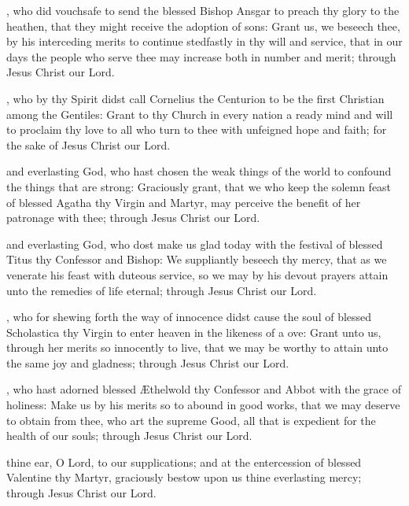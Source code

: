 , who did vouchsafe to send the blessed Bishop Ansgar to preach thy glory to the heathen, that they might receive the adoption of sons: Grant us, we beseech thee, by his interceding merits to continue stedfastly in thy will and service, that in our days the people who serve thee may increase both in number and merit; through Jesus Christ our Lord.

, who by thy Spirit didst call Cornelius the Centurion to be the first Christian among the Gentiles: Grant to thy Church in every nation a ready mind and will to proclaim thy love to all who turn  to thee with unfeigned hope and faith; for the sake of Jesus Christ our Lord.

 and everlasting God, who hast chosen the weak things of the world to confound the things that are strong: Graciously grant, that we who keep the solemn feast of blessed Agatha thy Virgin and Martyr, may perceive the benefit of her patronage with thee; through Jesus Christ our Lord.

 and everlasting God, who dost make us glad today with the festival of blessed Titus thy Confessor and Bishop: We suppliantly beseech thy mercy, that as we venerate his feast with duteous service, so we may by his devout prayers attain unto the remedies of life eternal; through Jesus Christ our Lord.

, who for shewing forth the way of innocence didst cause the soul of blessed Scholastica thy Virgin to enter heaven in the likeness of a ove: Grant unto us, through her merits so innocently to live, that we may be worthy to attain unto the same joy and gladness; through Jesus Christ our Lord.

, who hast adorned blessed Æthelwold thy Confessor and Abbot with the grace of holiness: Make us by his merits so to abound in good works, that we may deserve to obtain from thee, who art the supreme Good, all that is expedient for the health of our souls; through Jesus Christ our Lord.

 thine ear, O Lord, to our supplications; and at the entercession of blessed Valentine thy Martyr, graciously bestow upon us thine everlasting mercy; through Jesus Christ our Lord.

